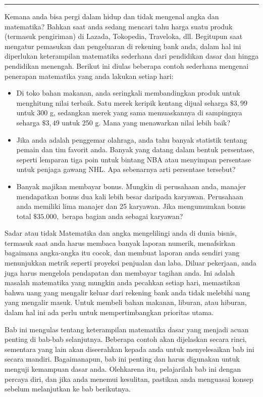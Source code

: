 \documentclass[
]{book}
\providecommand{\tightlist}{%
  \setlength{\itemsep}{0pt}\setlength{\parskip}{0pt}}
\begin{document}
\begin{center}\rule{0.5\linewidth}{0.5pt}\end{center}

Kemana anda bisa pergi dalam hidup dan tidak mengenal angka dan matematika? Bahkan saat anda sedang mencari tahu harga suatu produk (termasuk pengiriman) di Lazada, Tokopedia, Traveloka, dll. Begitupun saat mengatur pemasukan dan pengeluaran di rekening bank anda, dalam hal ini diperlukan keterampilan matematika sederhana dari pendidikan dasar dan hingga pendidikan menengah. Berikut ini diulas beberapa contoh sederhana mengenai penerapan matematika yang anda lakukan setiap hari:

\begin{itemize}
\tightlist
\item
  Di toko bahan makanan, anda seringkali membandingkan produk untuk menghitung nilai terbaik. Satu merek keripik kentang dijual seharga \(\$ 3,99\) untuk 300 g, sedangkan merek yang sama memuaskannya di sampingnya seharga \(\$ 3,49\) untuk 250 g. Mana yang menawarkan nilai lebih baik?
\item
  Jika anda adalah penggemar olahraga, anda tahu banyak statistik tentang pemain dan tim favorit anda. Banyak yang datang dalam bentuk persentase, seperti lemparan tiga poin untuk bintang NBA atau menyimpan persentase untuk penjaga gawang NHL. Apa sebenarnya arti persentase tersebut?
\item
  Banyak majikan membayar bonus. Mungkin di perusahaan anda, manajer mendapatkan bonus dua kali lebih besar daripada karyawan. Perusahaan anda memiliki lima manajer dan 25 karyawan. Jika mengumumkan bonus total \(\$ 35.000,\) berapa bagian anda sebagai karyawan?
\end{itemize}

Sadar atau tidak Matematika dan angka mengelilingi anda di dunia bisnis, termasuk saat anda harus membaca banyak laporan numerik, menafsirkan bagaimana angka-angka itu cocok, dan membuat laporan anda sendiri yang menunjukkan metrik seperti proyeksi penjualan dan laba. Diluar pekerjaan, anda juga harus mengelola pendapatan dan membayar tagihan anda. Ini adalah masalah matematika yang mungkin anda pecahkan setiap hari, memastikan bahwa uang yang mengalir keluar dari rekening bank anda tidak melebihi uang yang mengalir masuk. Untuk membeli bahan makanan, liburan, atau hiburan, dalam hal ini ada perlu untuk mempertimbangkan prioritas utama.

Bab ini mengulas tentang keterampilan matematika dasar yang menjadi acuan penting di bab-bab selanjutnya. Beberapa contoh akan dijelaskan secara rinci, sementara yang lain akan diseerahkan kepada anda untuk menyelesaikan bab ini secara mandiri. Bagaimanapun, bab ini penting dan harus digunakan untuk menguji kemampuan dasar anda. Olehkarena itu, pelajarilah bab ini dengan percaya diri, dan jika anda menemui kesulitan, pastikan anda menguasai konsep sebelum melanjutkan ke bab berikutnya.
\end{document}
